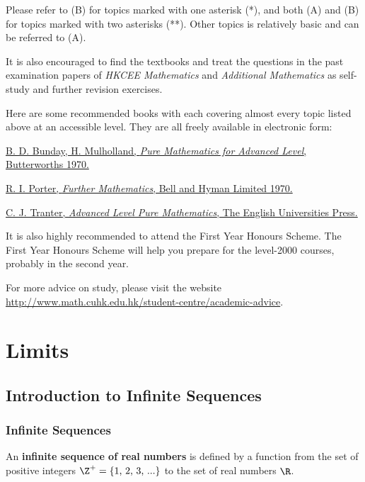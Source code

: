 Please refer to (B) for topics marked with one asterisk (*), and both (A) and (B) for topics marked with two asterisks (**). Other topics is relatively basic and can be referred to (A).\n

It is also encouraged to find the textbooks and treat the questions in the past examination papers of \textit{HKCEE Mathematics} and \textit{Additional Mathematics} as self-study and further revision exercises.\n

Here are some recommended books with each covering almost every topic listed above at an accessible level. They are all freely available in electronic form:
\begin{rlist}
  \item \href{https://archive.org/details/PureMathematicsForAdvancedLevel}{B. D. Bunday, H. Mulholland, \textit{Pure Mathematics for Advanced Level}, Butterworths 1970.}
  \item \href{https://archive.org/details/FurtherMathematics}{R. I. Porter, \textit{Further Mathematics}, Bell and Hyman Limited 1970.}
  \item \href{https://archive.org/details/in.ernet.dli.2015.285850}{C. J. Tranter, \textit{Advanced Level Pure Mathematics}, The English Universities Press.}
\end{rlist}

It is also highly recommended to attend the First Year Honours Scheme. The First Year Honours Scheme will help you prepare for the level-2000 courses, probably in the second year.\n

For more advice on study, please visit the website \url{http://www.math.cuhk.edu.hk/student-centre/academic-advice}.
\pagebreak

\section{Limits}
\subsection{Introduction to Infinite Sequences}
\subsubsection{Infinite Sequences}
\begin{dft}
  An \textbf{infinite sequence of real numbers} is defined by a function from the set of positive integers $\Z^{+}=\left\{ 1\text{, }2\text{, }3\text{, ...} \right\}$ to the set of real numbers $\R$.
\end{dft}

